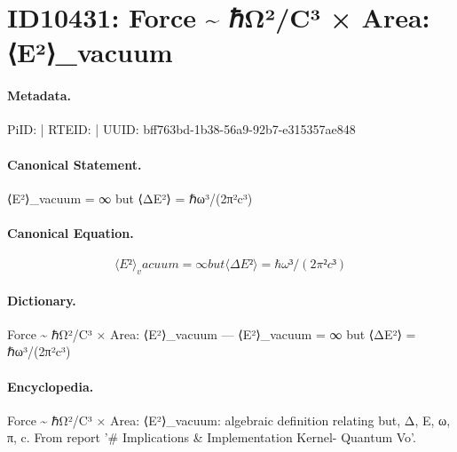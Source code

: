 \section*{ID10431: Force \textasciitilde{} ℏΩ²/C³ × Area: ⟨E²⟩\_vacuum}
\paragraph{Metadata.}
PiID:  | RTEID:  | UUID: bff763bd-1b38-56a9-92b7-e315357ae848

\paragraph{Canonical Statement.}
⟨E²⟩\_vacuum = ∞ but ⟨ΔE²⟩ = ℏω³/(2π²c³)

\paragraph{Canonical Equation.}
\[
⟨E²⟩_vacuum = ∞ but ⟨ΔE²⟩ = ℏω³/(2π²c³)
\]

\paragraph{Dictionary.}
Force \textasciitilde{} ℏΩ²/C³ × Area: ⟨E²⟩\_vacuum — ⟨E²⟩\_vacuum = ∞ but ⟨ΔE²⟩ = ℏω³/(2π²c³)

\paragraph{Encyclopedia.}
Force \textasciitilde{} ℏΩ²/C³ × Area: ⟨E²⟩\_vacuum: algebraic definition relating but, Δ, E, ω, π, c. From report '\# Implications \& Implementation Kernel- Quantum Vo'.
